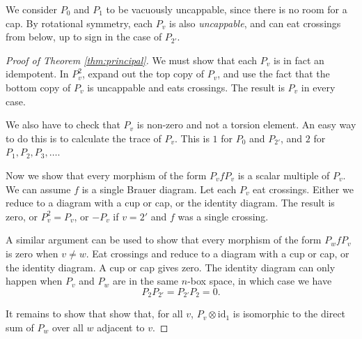 \documentclass{article}
\newcommand{\id}{\mathrm{id}}
\begin{document}
We consider $P_0$ and $P_1$ to be vacuously uncappable, since there
is no room for a cap.  By rotational symmetry, each $P_v$ is also
\emph{uncappable}, and can eat crossings from below, up to sign in the
case of $P_{2'}$.

\begin{proof}[Proof of Theorem \ref{thm:principal}]
We must show that each $P_v$ is in fact an idempotent.  In $P_v^2$, expand
out the top copy of $P_v$, and use the fact that the bottom copy of $P_v$
is uncappable and eats crossings.  The result is $P_v$ in every case.

We also have to check that $P_v$ is non-zero and not a torsion element.
An easy way to do this is to calculate the trace of $P_v$.  This is $1$
for $P_0$ and $P_{2'}$, and $2$ for $P_1,P_2,P_3,\dots$.

Now we show that every morphism of the form $P_vfP_v$ is a scalar
multiple of $P_v$.  We can assume $f$ is a single Brauer diagram.
Let each $P_v$ eat crossings.  Either we reduce to a diagram with a cup
or cap, or the identity diagram.  The result is zero, or $P_v^2=P_v$,
or $-P_v$ if $v=2'$ and $f$ was a single crossing.

A similar argument can be used to show that every morphism of the form
$P_wfP_v$ is zero when $v \neq w$.  Eat crossings and reduce to a diagram
with a cup or cap, or the identity diagram.  A cup or cap gives zero.
The identity diagram can only happen when $P_v$ and $P_w$ are in the
same $n$-box space, in which case we have
$$P_2 P_{2'} = P_{2'} P_2 = 0.$$

It remains to show that show that, for all $v$, $P_v \otimes \id_1$
is isomorphic to the direct sum of $P_w$ over all $w$ adjacent to $v$.


\end{proof}
\end{document}
